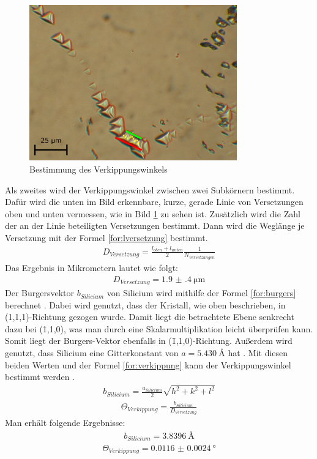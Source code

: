 \documentclass[german, %
parskip=full, %
bibliography=totoc, %
]{scrartcl}
\begin{document}
\begin{figure}[ht] 
  \centering
     \includegraphics[width=0.8\textwidth]{Silicium_3_50_mal_verkippung}
  \caption{Bestimmung des Verkippungswinkels}
  \label{fig:verkippung}
\end{figure}

Als zweites wird der Verkippungswinkel zwischen zwei Subkörnern bestimmt. Dafür wird die unten im Bild erkennbare, kurze, gerade Linie von Versetzungen oben und unten vermessen, wie in Bild \ref{fig:verkippung} zu sehen ist. Zusätzlich wird die Zahl der an der Linie beteiligten Versetzungen bestimmt. Dann wird die Weglänge je Versetzung mit der Formel \ref{for:lversetzung} bestimmt.
\begin{align}
D_{Versetzung} = \frac{l_{oben} + l_{unten}}{2} \frac{1}{N_{Versetzungen}} \label{for:lversetzung}
\end{align}
Das Ergebnis in Mikrometern lautet wie folgt:
\begin{align*}
D_{Versetzung} = \SI[separate-uncertainty = true]{1.9(4)}{\micro\meter}
\end{align*}
Der Burgersvektor $b_{Silicium}$ von Silicium wird mithilfe der Formel \ref{for:burgers} berechnet \cite{burgers}. Dabei wird genutzt, dass der Kristall, wie oben beschrieben, in (1,1,1)-Richtung gezogen wurde. Damit liegt die betrachtete Ebene senkrecht dazu bei (\={1},1,0), was man durch eine Skalarmultiplikation leicht überprüfen kann. Somit liegt der Burgers-Vektor ebenfalls in (\={1},1,0)-Richtung. Außerdem wird genutzt, dass Silicium eine Gitterkonstant von $a = \SI{5.430}{\angstrom}$ hat \cite[S.24]{kittel}. Mit diesen beiden Werten und der Formel \ref{for:verkippung} kann der Verkippungswinkel bestimmt werden \cite[S.661]{kittel}.
\begin{align}
b_{Silicium} = \frac{a_{Silicium}}{2}\sqrt{h^2+k^2+l^2} \label{for:burgers}
\end{align}
\begin{align}
\Theta_{Verkippung} = \frac{b_{Silicium}}{D_{Versetzung}} \label{for:verkippung}
\end{align}
Man erhält folgende Ergebnisse:
\begin{align*}
b_{Silicium} = \SI{3.8396}{\angstrom}
\end{align*}
\begin{align*}
\Theta_{Verkippung} = \SI[separate-uncertainty = true]{0.0116(24)}{\degree}
\end{align*}
\end{document}
